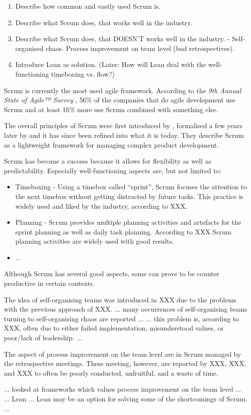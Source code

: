 \begin{enumerate}
	\item Describe how common and vastly used Scrum is.
	\item Describe what Scrum does, that works well in the industry.
	\item Describe what Scrum does, that DOESN'T works well in the industry. - Self-organised chaos. Process improvement on team level (bad retrospectives).
	\item Introduce Lean as solution. (Later: How will Lean deal with the well-functioning timeboxing vs. flow?)
\end{enumerate}

Scrum is currently the most used agile framework. According to the \textit{9th Annual State of Agile™ Survey} \citep{VersionOne}, 56\% of the companies that do agile development use Scrum and at least 16\% more use Scrum combined with something else.

The overall principles of Scrum were first introduced by \citet{Takeuchi1986}, formalised a few years later by \citet{Schwaber} and it has since been refined into what it is today.
They describe Scrum as a lightweight framework for managing complex product development. 

Scrum has become a success because it allows for flexibility as well as predictability.
Especially well-functioning aspects are, but not limited to:
\begin{itemize}
	\item Timeboxing - Using a timebox called “sprint”, Scrum focuses the attention to the next timebox without getting distracted by future tasks. This practice is widely used and liked by the industry, according to XXX.
	\item Planning - Scrum provides multiple planning activities and artefacts for the sprint planning as well as daily task planning. According to XXX Scrum planning activities are widely used with good results.
	\item ...
\end{itemize}

Although Scrum has several good aspects, some can prove to be counter productive in certain contexts.
 
The idea of self-organising teams was introduced in XXX due to the problems with the previous approach of XXX.
... many occurrences of self-organising teams turning to self-organising chaos are reported ...
... this problem is, according to XXX, often due to either failed implementation, misunderstood values, or poor/lack of leadership. ...

The aspect of process improvement on the team level are in Scrum managed by the retrospective meetings. These meeting, however, are reported by XXX, XXX, and XXX to often be poorly conducted, unfruitful, and a waste of time. 

... looked at frameworks which values process improvement on the team level ...
... Lean ... Lean may be an option for solving some of the shortcomings of Scrum. ...